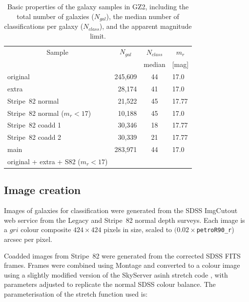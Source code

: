\documentclass[useAMS,usenatbib]{mn2e}
\begin{document}
\begin{table}
 \begin{tabular}{@{}lrcl}
 \hline
\multicolumn{1}{c}{Sample} &
\multicolumn{1}{c}{$N_{gal}$} &
\multicolumn{1}{c}{$N_{class}$} &
\multicolumn{1}{c}{$m_r$} 
\\ 
\multicolumn{1}{c}{} &
\multicolumn{1}{c}{} &
\multicolumn{1}{c}{median} &
\multicolumn{1}{c}{[mag]} 
\\ 
\hline
\hline						
original                       & 245,609 & 44  & 17.0   \\     %
extra                          &  28,174 & 41  & 17.0   \\     %
Stripe~82 normal               &  21,522 & 45  & 17.77  \\     %
Stripe~82 normal ($m_r<17$)    &  10,188 & 45  & 17.0   \\     %
Stripe~82 coadd 1              &  30,346 & 18  & 17.77  \\     %
Stripe~82 coadd 2              &  30,339 & 21  & 17.77  \\     %
\hline
main                           & 283,971 & 44  & 17.0   \\     %
original + extra + S82 ($m_r<17$) & \\
\hline
 \end{tabular}
 \caption{Basic properties of the galaxy samples in GZ2, including the total number of galaxies ($N_{gal}$), the median number of classifications per galaxy ($N_{class}$), and the apparent magnitude limit. \label{tbl-sample}}
\end{table}

\subsection{Image creation}\label{ssec-imagecreation}

Images of galaxies for classification were generated from the SDSS ImgCutout web service \citep{nie04} from the Legacy and Stripe~82 normal depth surveys. Each image is a $gri$ colour composite $424\times424$ pixels in size, scaled to $(0.02\times${\tt petroR90\_r}) arcsec per pixel.

Coadded images from Stripe~82 were generated from the corrected SDSS FITS frames. Frames were combined using Montage \citep{jac10} and converted to a colour image using a slightly modified version of the SkyServer asinh stretch code \citep{lup04}, with parameters adjusted to replicate the normal SDSS colour balance. The parameterisation of the stretch function used is:
\end{document}
